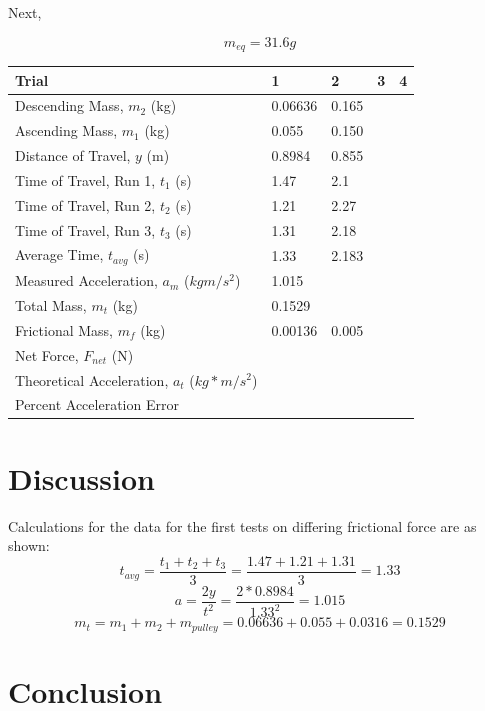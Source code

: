 \documentclass[11pt, titlepage]{article}
\begin{document}
Next, 

\begin{center}
$$m_{eq} = 31.6 g$$
\begin{tabular}
{|m{7em}|m{7em}|m{7em}|m{7em}|m{7em}|}
\hline
Trial & 1 & 2 & 3 & 4 \\
\hline
Descending Mass, $m_2$ (kg) & 0.06636 & 0.165 & & \\
\hline
Ascending Mass, $m_1$ (kg) & 0.055 & 0.150 & & \\
\hline
Distance of Travel, $y$ (m) & 0.8984 & 0.855 & & \\
\hline
Time of Travel, Run 1, $t_1$ (s) & 1.47 & 2.1 & & \\
\hline
Time of Travel, Run 2, $t_2$ (s) & 1.21 & 2.27 & & \\
\hline
Time of Travel, Run 3, $t_3$ (s) & 1.31 & 2.18 & & \\
\hline
Average Time, $t_{avg}$ (s) & 1.33 & 2.183 & & \\
Measured Acceleration, $a_m$ ($kgm/s^2$) & 1.015 & & & \\
\hline
Total Mass, $m_t$ (kg) & 0.1529 & & & \\
\hline
Frictional Mass, $m_f$ (kg) & 0.00136 & 0.005 & & \\
\hline
Net Force, $F_{net}$ (N) & & & & \\ 
\hline
Theoretical Acceleration, $a_t$ ($kg*m/s^2$) & & & & \\
\hline
Percent Acceleration Error & & & & \\
\hline
\end{tabular}
\end{center}

\section*{Discussion}
Calculations for the data for the first tests on differing frictional force are as shown:
$$t_{avg} = \frac{t_1 + t_2 + t_3}{3} = \frac{1.47 + 1.21 + 1.31}{3} = 1.33$$
$$a = \frac{2y}{t^2} = \frac{2*0.8984}{1.33^2} = 1.015$$
$$m_t = m_1 + m_2 + m_{pulley}  = 0.06636 + 0.055 + 0.0316 = 0.1529$$

\section*{Conclusion}
\end{document}
